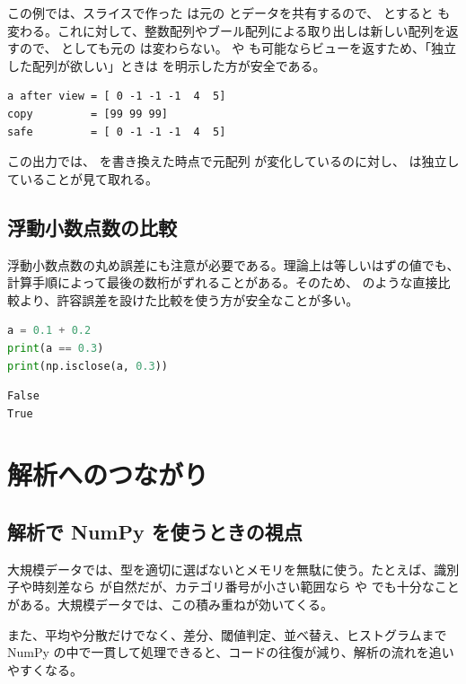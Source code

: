 この例では、スライスで作った  は元の  とデータを共有するので、 とすると  も変わる。これに対して、整数配列やブール配列による取り出しは新しい配列を返すので、 としても元の  は変わらない。 や  も可能ならビューを返すため、「独立した配列が欲しい」ときは  を明示した方が安全である。

\begin{lstlisting}[numbers=none, xleftmargin=2\zw]
a after view = [ 0 -1 -1 -1  4  5]
copy         = [99 99 99]
safe         = [ 0 -1 -1 -1  4  5]
\end{lstlisting}

この出力では、 を書き換えた時点で元配列  が変化しているのに対し、 は独立していることが見て取れる。

\subsection{浮動小数点数の比較}

浮動小数点数の丸め誤差にも注意が必要である。理論上は等しいはずの値でも、計算手順によって最後の数桁がずれることがある。そのため、 のような直接比較より、許容誤差を設けた比較を使う方が安全なことが多い。

\begin{lstlisting}[language=Python]
a = 0.1 + 0.2
print(a == 0.3)
print(np.isclose(a, 0.3))
\end{lstlisting}

\begin{lstlisting}[numbers=none, xleftmargin=2\zw]
False
True
\end{lstlisting}

\section{解析へのつながり}

\subsection{解析で NumPy を使うときの視点}

大規模データでは、型を適切に選ばないとメモリを無駄に使う。たとえば、識別子や時刻差なら  が自然だが、カテゴリ番号が小さい範囲なら  や  でも十分なことがある。大規模データでは、この積み重ねが効いてくる。

また、平均や分散だけでなく、差分、閾値判定、並べ替え、ヒストグラムまで NumPy の中で一貫して処理できると、コードの往復が減り、解析の流れを追いやすくなる。

